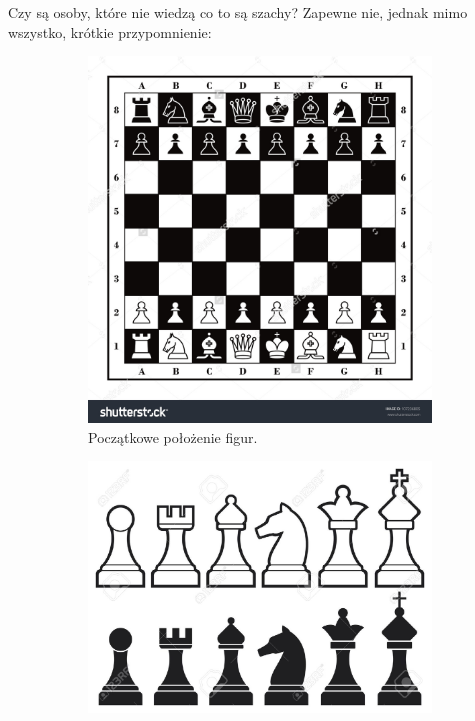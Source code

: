 \newpage
Czy są osoby, które nie wiedzą co to są szachy? Zapewne nie, jednak mimo wszystko, krótkie przypomnienie:
\begin{figure}[H]
	\begin{subfigure}{0.40\textwidth}
		\centering
 		\includegraphics[width=\textwidth]{szachownica.jpg}
    	\caption{Początkowe położenie figur.}
 		\label{rys3}
	\end{subfigure}
	\hfill
	\begin{subfigure}{0.40\textwidth}
		\centering
		\includegraphics[width=\textwidth]{figury_szachowe.jpg}

\end{subfigure}
\end{figure}
